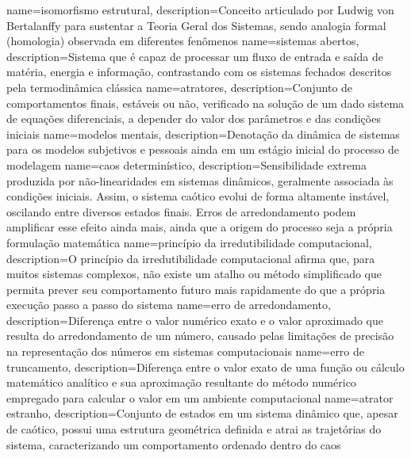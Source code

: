 {
    name=isomorfismo estrutural,
    description={Conceito articulado por Ludwig von Bertalanffy para sustentar a Teoria Geral dos Sistemas, sendo analogia formal (homologia) observada em diferentes fenômenos}
}
{
    name=sistemas abertos,
    description={Sistema que é capaz de processar um fluxo de entrada e saída de matéria, energia e informação, contrastando com os sistemas fechados descritos pela termodinâmica clássica}
}
{
    name=atratores,
    description={Conjunto de comportamentos finais, estáveis ou não, verificado na solução de um dado sistema de equações diferenciais, a depender do valor dos parâmetros e das condições iniciais}
}
{
    name=modelos mentais,
    description={Denotação da dinâmica de sistemas para os modelos subjetivos e pessoais ainda em um estágio inicial do processo de modelagem}
}
{
    name=caos determinístico,
    description={Sensibilidade extrema produzida por não-linearidades em sistemas dinâmicos, geralmente associada às condições iniciais. Assim, o sistema caótico evolui de forma altamente instável, oscilando entre diversos estados finais. Erros de arredondamento podem amplificar esse efeito ainda mais, ainda que a origem do processo seja a própria formulação matemática}
}
{
    name=princípio da irredutibilidade computacional,
    description={O princípio da irredutibilidade computacional afirma que, para muitos sistemas complexos, não existe um atalho ou método simplificado que permita prever seu comportamento futuro mais rapidamente do que a própria execução passo a passo do sistema}
}
{
    name=erro de arredondamento,
    description={Diferença entre o valor numérico exato e o valor aproximado que resulta do arredondamento de um número, causado pelas limitações de precisão na representação dos números em sistemas computacionais}
}
{
    name=erro de truncamento,
    description={Diferença entre o valor exato de uma função ou cálculo matemático analítico e sua aproximação resultante do método numérico empregado para calcular o valor em um ambiente computacional}
}
{
    name=atrator estranho,
    description={Conjunto de estados em um sistema dinâmico que, apesar de caótico, possui uma estrutura geométrica definida e atrai as trajetórias do sistema, caracterizando um comportamento ordenado dentro do caos}
}

